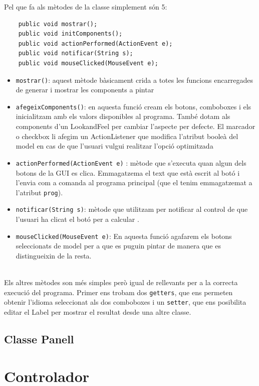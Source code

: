 \documentclass[conference]{IEEEtran}
\begin{document}
Pel que fa als mètodes de la classe simplement són 5:
\begin{verbatim}
    public void mostrar();
    public void initComponents();
    public void actionPerformed(ActionEvent e);
    public void notificar(String s);
    public void mouseClicked(MouseEvent e);
\end{verbatim}
\begin{itemize}
    \item \texttt{mostrar()}: aquest mètode bàsicament crida a totes les funcions encarregades de generar i mostrar les components a pintar\\
    \item \texttt{afegeixComponents()}: en aquesta funció cream els botons, comboboxes i els inicialitzam amb els valors disponibles al programa. També dotam als components d'un LookandFeel per cambiar l'aspecte per defecte. El marcador o checkbox li afegim un ActionListener que modifica l'atribut booleà del model en cas de que l'usuari vulgui realitzar l'opció optimitzada\\
    \item \texttt{actionPerformed(ActionEvent e)} : mètode que s'executa quan algun dels botons de la GUI es clica. Emmagatzema el text que està escrit al botó i l'envia com a comanda al programa principal (que el tenim emmagatzemat a l'atribut \texttt{prog}).\\
    \item \texttt{notificar(String s)}: mètode que utilitzam per notificar al control de que l'usuari ha clicat el botó per a calcular .\\
    \item  \texttt{mouseClicked(MouseEvent e)}: En aquesta funció agafarem els botons seleccionats de model per a que es puguin pintar de manera que es distingueixin de la resta.
\end{itemize}
\\ Els altres mètodes son més simples però igual de rellevants per a la correcta execució del programa. Primer ens trobam dos \texttt{getters}, que ens permeten obtenir l'idioma seleccionat als dos comboboxes i un \texttt{setter}, que ens posibilita editar el Label per mostrar el resultat desde una altre classe.

\subsection{Classe Panell}

\section{Controlador}
\end{document}
